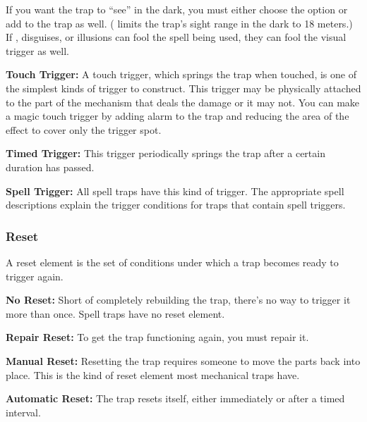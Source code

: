 
If you want the trap to ``see'' in the dark, you must either choose the  option or add  to the trap as well. ( limits the trap's sight range in the dark to 18 meters.) If , disguises, or illusions can fool the spell being used, they can fool the visual trigger as well.

\textbf{Touch Trigger:} A touch trigger, which springs the trap when touched, is one of the simplest kinds of trigger to construct. This trigger may be physically attached to the part of the mechanism that deals the damage or it may not. You can make a magic touch trigger by adding alarm to the trap and reducing the area of the effect to cover only the trigger spot.

\textbf{Timed Trigger:} This trigger periodically springs the trap after a certain duration has passed.

\textbf{Spell Trigger:} All spell traps have this kind of trigger. The appropriate spell descriptions explain the trigger conditions for traps that contain spell triggers.

\subsubsection{Reset}
A reset element is the set of conditions under which a trap becomes ready to trigger again.

\textbf{No Reset:} Short of completely rebuilding the trap, there's no way to trigger it more than once. Spell traps have no reset element.

\textbf{Repair Reset:} To get the trap functioning again, you must repair it.

\textbf{Manual Reset:} Resetting the trap requires someone to move the parts back into place. This is the kind of reset element most mechanical traps have.

\textbf{Automatic Reset:} The trap resets itself, either immediately or after a timed interval.

